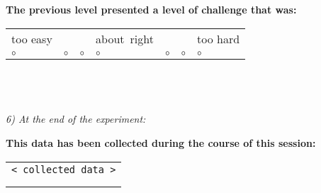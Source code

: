 \textbf{The previous level presented a level of challenge that was:}

\begin{tabularx}{\linewidth}%
 {>{\centering}X%
  >{\centering}X%
  >{\centering}X%
  >{\centering}X%
  >{\centering}X%
  >{\centering}X%
  >{\centering}X}
   too easy & & & about~right & & & too hard\tabularnewline
$\circ$ & $\circ$ & $\circ$ & $\circ$ & $\circ$ & $\circ$ & $\circ$
\end{tabularx}
\\
\\
\\

\textit{6) At the end of the experiment:}

\textbf{This data has been collected during the course of this session:}

\begin{tabular}{|l|}
\hline
\texttt{< collected data >}\\
\\
\\
\hline
\end{tabular}


\newpage